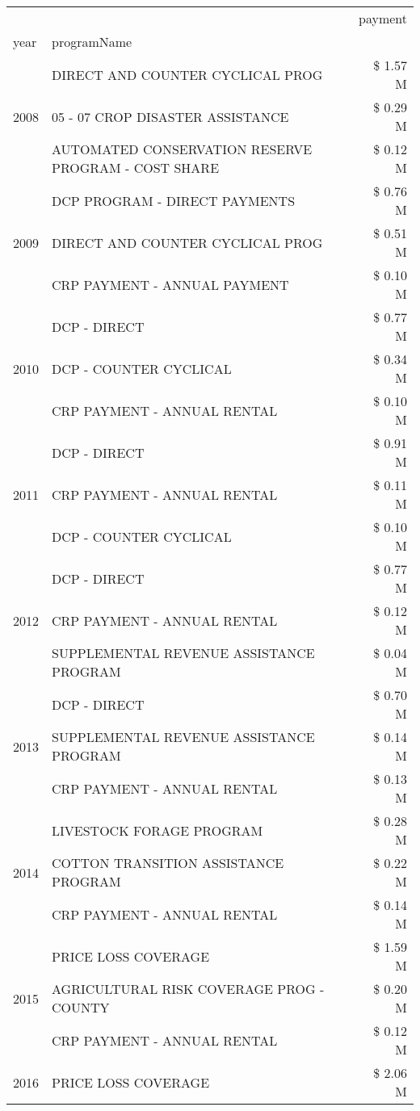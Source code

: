 \begin{tabular}{llr}
\toprule
 &  & payment \\
year & programName &  \\
\midrule
\multirow[t]{3}{*}{2008} & DIRECT AND COUNTER CYCLICAL PROG & \$ 1.57 M \\
 & 05 - 07 CROP DISASTER ASSISTANCE & \$ 0.29 M \\
 & AUTOMATED CONSERVATION RESERVE PROGRAM - COST SHARE & \$ 0.12 M \\
\cline{1-3}
\multirow[t]{3}{*}{2009} & DCP PROGRAM - DIRECT PAYMENTS & \$ 0.76 M \\
 & DIRECT AND COUNTER CYCLICAL PROG & \$ 0.51 M \\
 & CRP PAYMENT - ANNUAL PAYMENT & \$ 0.10 M \\
\cline{1-3}
\multirow[t]{3}{*}{2010} & DCP - DIRECT & \$ 0.77 M \\
 & DCP - COUNTER CYCLICAL & \$ 0.34 M \\
 & CRP PAYMENT - ANNUAL RENTAL & \$ 0.10 M \\
\cline{1-3}
\multirow[t]{3}{*}{2011} & DCP - DIRECT & \$ 0.91 M \\
 & CRP PAYMENT - ANNUAL RENTAL & \$ 0.11 M \\
 & DCP - COUNTER CYCLICAL & \$ 0.10 M \\
\cline{1-3}
\multirow[t]{3}{*}{2012} & DCP - DIRECT & \$ 0.77 M \\
 & CRP PAYMENT - ANNUAL RENTAL & \$ 0.12 M \\
 & SUPPLEMENTAL REVENUE ASSISTANCE PROGRAM & \$ 0.04 M \\
\cline{1-3}
\multirow[t]{3}{*}{2013} & DCP - DIRECT & \$ 0.70 M \\
 & SUPPLEMENTAL REVENUE ASSISTANCE PROGRAM & \$ 0.14 M \\
 & CRP PAYMENT - ANNUAL RENTAL & \$ 0.13 M \\
\cline{1-3}
\multirow[t]{3}{*}{2014} & LIVESTOCK FORAGE PROGRAM & \$ 0.28 M \\
 & COTTON TRANSITION ASSISTANCE PROGRAM & \$ 0.22 M \\
 & CRP PAYMENT - ANNUAL RENTAL & \$ 0.14 M \\
\cline{1-3}
\multirow[t]{3}{*}{2015} & PRICE LOSS COVERAGE & \$ 1.59 M \\
 & AGRICULTURAL RISK COVERAGE PROG - COUNTY & \$ 0.20 M \\
 & CRP PAYMENT - ANNUAL RENTAL & \$ 0.12 M \\
\cline{1-3}
\multirow[t]{3}{*}{2016} & PRICE LOSS COVERAGE & \$ 2.06 M \\

\end{tabular}
